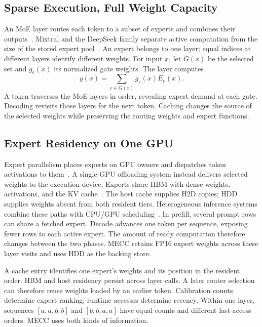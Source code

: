 \documentclass[conference,9pt,letterpaper]{IEEEtran}
\begin{document}
\subsection{Sparse Execution, Full Weight Capacity}
An MoE layer routes each token to a subset of experts and combines their outputs~\cite{shazeer,switch,gshard}. Mixtral and the DeepSeek family separate active computation from the size of the stored expert pool~\cite{mixtral,deepseekmoe,deepseekv2,deepseekv3,mixtral22}. An expert belongs to one layer; equal indices at different layers identify different weights. For input $x$, let $G(x)$ be the selected set and $g_e(x)$ its normalized gate weights. The layer computes
\begin{equation}
y(x)=\sum_{e\in G(x)}g_e(x)E_e(x).
\end{equation}
A token traverses the MoE layers in order, revealing expert demand at each gate. Decoding revisits those layers for the next token. Caching changes the source of the selected weights while preserving the routing weights and expert functions.

\subsection{Expert Residency on One GPU}
Expert parallelism places experts on GPU owners and dispatches token activations to them~\cite{deepspeedmoe,tutel,megablocks,flashmoedist,harmoeny}. A single-GPU offloading system instead delivers selected weights to the execution device. Experts share HBM with dense weights, activations, and the KV cache~\cite{pagedattention,sglang}. The host cache supplies H2D copies; HDD supplies weights absent from both resident tiers. Heterogeneous inference systems combine these paths with CPU/GPU scheduling~\cite{flexgen,dsinference,zeroinfinity,llmflash,powerinfer}. In prefill, several prompt rows can share a fetched expert. Decode advances one token per sequence, exposing fewer rows to each active expert. The amount of ready computation therefore changes between the two phases. MECC retains FP16 expert weights across these layer visits and uses HDD as the backing store.

A cache entry identifies one expert's weights and its position in the resident order. HBM and host residency persist across layer calls. A later router selection can therefore reuse weights loaded by an earlier token. Calibration counts determine expert ranking; runtime accesses determine recency. Within one layer, sequences $[a,a,b,b]$ and $[b,b,a,a]$ have equal counts and different last-access orders. MECC uses both kinds of information.
\end{document}
